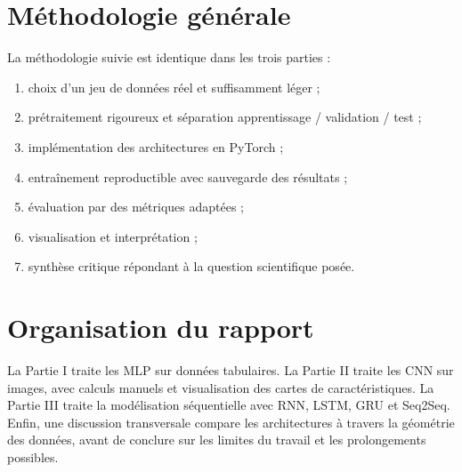 \section{Méthodologie générale}
La méthodologie suivie est identique dans les trois parties :
\begin{enumerate}
    \item choix d’un jeu de données réel et suffisamment léger ;
    \item prétraitement rigoureux et séparation apprentissage / validation / test ;
    \item implémentation des architectures en PyTorch ;
    \item entraînement reproductible avec sauvegarde des résultats ;
    \item évaluation par des métriques adaptées ;
    \item visualisation et interprétation ;
    \item synthèse critique répondant à la question scientifique posée.
\end{enumerate}

\section{Organisation du rapport}
La Partie I traite les MLP sur données tabulaires. La Partie II traite les CNN sur images, avec calculs manuels et visualisation des cartes de caractéristiques. La Partie III traite la modélisation séquentielle avec RNN, LSTM, GRU et Seq2Seq. Enfin, une discussion transversale compare les architectures à travers la géométrie des données, avant de conclure sur les limites du travail et les prolongements possibles.


